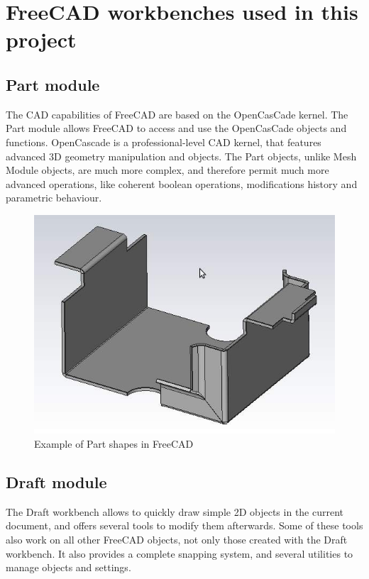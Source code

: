 \section{FreeCAD workbenches used in this project}
\subsection{Part module}
The CAD capabilities of FreeCAD are based on the OpenCasCade kernel. The 
Part module allows FreeCAD to access and use the OpenCasCade objects and 
functions. OpenCascade is a professional-level CAD kernel, that features 
advanced 3D geometry manipulation and objects. The Part objects, unlike 
Mesh Module objects, are much more complex, and therefore permit much more 
advanced operations, like coherent boolean operations, modifications history 
and parametric behaviour.
\begin{figure}[h!]                                                       
\begin{center}                                                          
\includegraphics[scale=0.5]{images/Part_example.jpg}                     
\caption{Example of Part shapes in FreeCAD}                             \end{center} 
\end{figure}
\subsection{Draft module}
The Draft workbench allows to quickly draw simple 2D objects in the current 
document, and offers several tools to modify them afterwards. Some of these 
tools also work on all other FreeCAD objects, not only those created with 
the Draft workbench. It also provides a complete snapping system, and 
several utilities to manage objects and settings.
